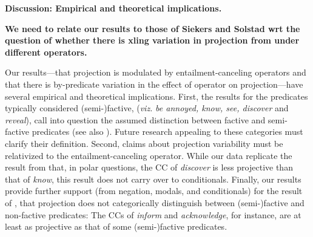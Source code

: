 \documentclass[12pt, letterpaper]{article}
\begin{document}
{\bf Discussion:  Empirical and theoretical implications.} 

{\bf We need to relate our results to those of Siekers and Solstad wrt the question of whether there is xling variation in projection from under different operators.}


	Our results---that projection is modulated by entailment-canceling operators and that there is by-predicate variation in the effect of operator on projection---have several empirical and theoretical implications. First, the results for the predicates typically considered (semi-)factive, ({\em viz.} \emph{be annoyed, know, see, discover} and \emph{reveal}), call into question the assumed distinction between factive and semi-factive predicates (see also \citealp{beaver_have_2010}). Future research appealing to these categories must clarify their definition. Second, claims about projection variability must be relativized to the entailment-canceling operator. While our data replicate the result from \citet{tonhauser_how_2018} that, in polar questions, the CC of \emph{discover} is less projective than that of \emph{know}, this result does not carry over to conditionals. Finally, our results provide further support (from negation, modals, and conditionals) for the result of \citet{degen_are_2022}, that projection does not categorically distinguish between (semi-)factive and non-factive predicates: The CCs of \emph{inform} and \emph{acknowledge}, for instance, are at least as projective as that of some (semi-)factive predicates.
	
\end{document}
